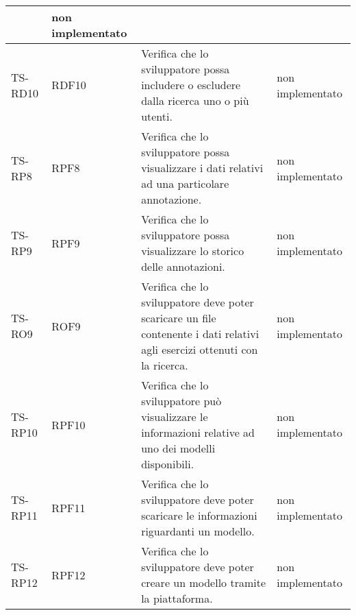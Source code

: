 \begin{longtable}{|>{\centering\arraybackslash}m{1.6cm}|>{\centering\arraybackslash}m{1.7cm}|m{6.41cm}|>{\centering\arraybackslash}m{3.1cm}|}
		& non implementato\\ \hline
		\rowcolor{LightGray}
		TS-RD10		
		& RDF10 
		& Verifica che lo sviluppatore possa includere o escludere dalla ricerca uno o più utenti. 
		& non implementato\\ \hline 
		\rowcolor{white}
		TS-RP8		
		& RPF8 
		& Verifica che lo sviluppatore possa visualizzare i dati relativi ad una particolare annotazione. 		
		& non implementato\\ \hline
		\rowcolor{LightGray}
		TS-RP9		
		& RPF9 
		& Verifica che lo sviluppatore possa visualizzare lo storico delle annotazioni. 
		&  non implementato\\ \hline
		\rowcolor{white}
		TS-RO9
		& ROF9 
		& Verifica che lo sviluppatore deve poter scaricare un file contenente i dati relativi agli esercizi ottenuti con la ricerca.
		& non implementato\\ \hline
		\rowcolor{LightGray}
		TS-RP10		
		& RPF10 
		& Verifica che lo sviluppatore può visualizzare le informazioni relative ad uno dei modelli disponibili. 
		& non implementato\\ \hline
		\rowcolor{white}
		TS-RP11		
		& RPF11 
		& Verifica che lo sviluppatore deve poter scaricare le informazioni riguardanti un modello. 
		& non implementato\\ \hline
		\rowcolor{LightGray}
		TS-RP12		
		& RPF12 
		& Verifica che lo sviluppatore deve poter creare un modello tramite la piattaforma. 
		& non implementato\\ \hline	
		

\end{longtable}
